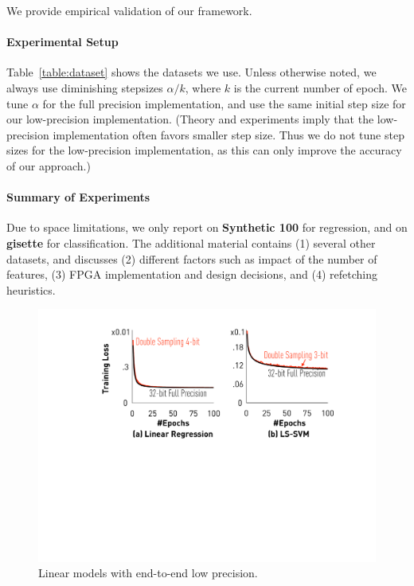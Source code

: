 \documentclass{article}
\begin{document}
\vspace{-0.5em}
We provide empirical validation of
our framework.

\vspace{-1em}
\paragraph{Experimental Setup} 
Table~\ref{table:dataset} shows the 
datasets we use. 
Unless otherwise noted, we always
use diminishing stepsizes $\alpha/k$,
where $k$ is the current number of
epoch. We tune 
$\alpha$ for the full precision
implementation, and use the
same initial step size for 
our low-precision 
implementation. (Theory and
experiments imply that the low-precision
implementation often favors smaller step size. 
Thus we do not tune step sizes for the low-precision 
implementation, as this can only improve the accuracy of our approach.) 

\vspace{-1.5em}
\paragraph*{Summary of Experiments}
Due to space limitations, we only report on {\bf Synthetic 100} for regression, and on 
{\bf gisette} for classification. 
The additional material contains (1) several other datasets, 
and discusses (2) different
factors such as impact of the number of features, 
(3) FPGA implementation and design
decisions, and (4) refetching heuristics.


\begin{figure}[t]
\centering
\includegraphics[width=0.68\columnwidth]{final-experiments/linearmodel} 
\vspace{-1em}
\caption{Linear models with end-to-end low precision.}
\vspace{-1.5em}
\label{fig:convergence}
\end{figure}
\end{document}
